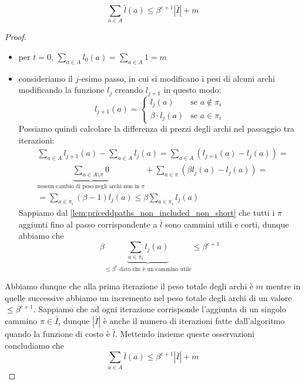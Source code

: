 \begin{lemma}\label{lem:priceddpaths_sum_l_a_leq_bc_i_m}
	$$
		\sum_{a \in A} \bar{l}(a) \leq \beta^{c+1} |\bar{I}| + m
	$$
\end{lemma}
\begin{proof}
	\begin{itemize}
		\item per $t = 0$, $\sum_{a \in A} l_0(a) = \sum_{a \in A} 1  = m$
		\item consideriamo il $j$-esimo passo, in cui si modificano i pesi
		      di alcuni archi modificando la funzione $l_{j}$ creando
		      $l_{j+1}$ in questo modo:
		      $$
			      l_{j+1}(a) =
			      \begin{cases}
				      l_j(a)             & \text{se } a \notin \pi_i \\
				      \beta \cdot l_j(a) & \text{se } a \in \pi_i
			      \end{cases}
		      $$
		      Possiamo quindi calcolare la differenza di prezzi degli archi
		      nel passaggio tra iterazioni:
		      \begin{align*}
			       & \sum_{a\in A} l_{j+1}(a) - \sum_{a \in A} l_j (a) = \sum_{a \in A} (l_{j+1}(a) - l_{j}(a)) =      \\
			       & \underbrace{\sum_{a \in A\setminus{\pi}} 0}_{\text{nessun cambio di peso negli archi non in }\pi}
			      + \sum_{a \in \pi}(\beta l_{j}(a) - l_{j}(a)) =                                                      \\
			       & = \sum_{a \in \pi_i} (\beta -1 ) l_j (a) \leq \beta \sum_{a \in \pi_i}l_j(a)
		      \end{align*}
			  Sappiamo dal \cref{lem:priceddpaths_non_included_non_short} che 
			  tutti i $\pi$ aggiunti fino al passo corrispondente a $\bar{l}$
			  sono cammini utili e corti, dunque abbiamo che
			  $$
			  	  \beta \underbrace{\sum_{a \in \pi_i}l_j(a)}_{\leq \beta^c \text{ dato che è un cammino utile}} \leq \beta^{c + 1}
			  $$
	\end{itemize}
	Abbiamo dunque che alla prima iterazione il peso totale degli archi è $m$
	mentre in quelle successive abbiamo un incremento nel peso totale degli archi 
	di un valore $\leq \beta^{c+1}$. Sappiamo che ad ogni iterazione 
	corrisponde l'aggiunta di un singolo cammino $\pi \in \bar{I}$, dunque $|\bar{I}|$ è
	anche il numero di iterazioni fatte dall'algoritmo quando la funzione di costo è $\bar{l}$. 
	Mettendo insieme queste osservazioni concludiamo che
	$$
	    \sum_{a \in A} \bar{l}(a) \leq \beta^{c+1} |\bar{I}| + m
	$$
\end{proof}


